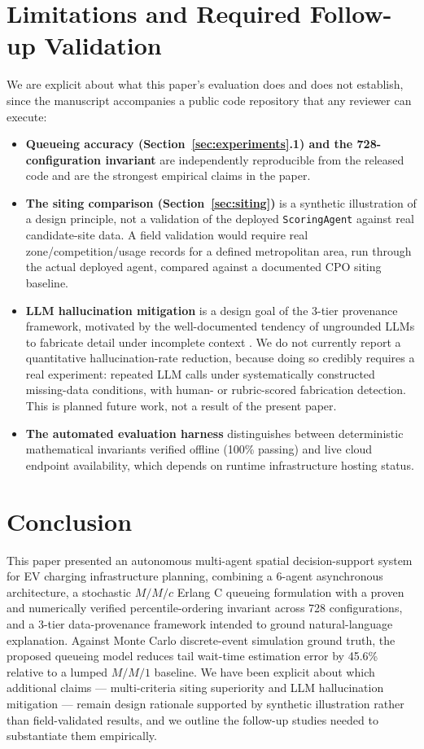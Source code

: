 \documentclass[preprint,12pt,authoryear]{elsarticle}
\begin{document}
\section{Limitations and Required Follow-up Validation}
\label{sec:limitations}
We are explicit about what this paper's evaluation does and does not establish, since the manuscript accompanies a public code repository that any reviewer can execute:
\begin{itemize}
    \item \textbf{Queueing accuracy (Section~\ref{sec:experiments}.1) and the 728-configuration invariant} are independently reproducible from the released code and are the strongest empirical claims in the paper.
    \item \textbf{The siting comparison (Section~\ref{sec:siting})} is a synthetic illustration of a design principle, not a validation of the deployed \texttt{ScoringAgent} against real candidate-site data. A field validation would require real zone/competition/usage records for a defined metropolitan area, run through the actual deployed agent, compared against a documented CPO siting baseline.
    \item \textbf{LLM hallucination mitigation} is a design goal of the 3-tier provenance framework, motivated by the well-documented tendency of ungrounded LLMs to fabricate detail under incomplete context \citep{lewis2020retrieval}. We do not currently report a quantitative hallucination-rate reduction, because doing so credibly requires a real experiment: repeated LLM calls under systematically constructed missing-data conditions, with human- or rubric-scored fabrication detection. This is planned future work, not a result of the present paper.
    \item \textbf{The automated evaluation harness} distinguishes between deterministic mathematical invariants verified offline (100\% passing) and live cloud endpoint availability, which depends on runtime infrastructure hosting status.
\end{itemize}

\section{Conclusion}
\label{sec:conclusion}
This paper presented an autonomous multi-agent spatial decision-support system for EV charging infrastructure planning, combining a 6-agent asynchronous architecture, a stochastic $M/M/c$ Erlang C queueing formulation with a proven and numerically verified percentile-ordering invariant across 728 configurations, and a 3-tier data-provenance framework intended to ground natural-language explanation. Against Monte Carlo discrete-event simulation ground truth, the proposed queueing model reduces tail wait-time estimation error by 45.6\% relative to a lumped $M/M/1$ baseline. We have been explicit about which additional claims --- multi-criteria siting superiority and LLM hallucination mitigation --- remain design rationale supported by synthetic illustration rather than field-validated results, and we outline the follow-up studies needed to substantiate them empirically.
\end{document}
